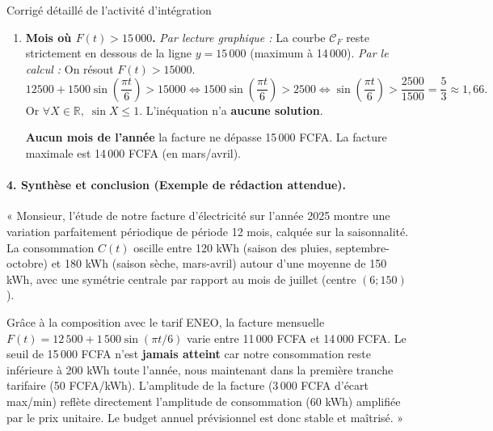\documentclass[11pt]{article}
\begin{document}
\begin{exoresolu}{Corrigé détaillé de l'activité d'intégration}
\begin{enumerate}
    \item \textbf{Mois où $F(t) > 15\,000$.}
    \emph{Par lecture graphique :} La courbe $\mathcal{C}_F$ reste strictement en dessous de la ligne $y=15\,000$ (maximum à 14\,000).
    \emph{Par le calcul :} On résout $F(t) > 15000$.
    \[
    12500 + 1500 \sin\left(\frac{\pi t}{6}\right) > 15000
    \iff 1500 \sin\left(\frac{\pi t}{6}\right) > 2500
    \iff \sin\left(\frac{\pi t}{6}\right) > \frac{2500}{1500} = \frac{5}{3} \approx 1,66.
    \]
    Or $\forall X \in \mathbb{R},\; \sin X \le 1$. L'inéquation n'a \textbf{aucune solution}.
    \begin{aretenir}[Conclusion Q3.2]
    \textbf{Aucun mois de l'année} la facture ne dépasse 15\,000 FCFA. La facture maximale est 14\,000 FCFA (en mars/avril).
    \end{aretenir}
\end{enumerate}

\paragraph{4. Synthèse et conclusion (Exemple de rédaction attendue).}
\begin{exemplebox}
« Monsieur, l'étude de notre facture d'électricité sur l'année 2025 montre une variation parfaitement périodique de période 12 mois, calquée sur la saisonnalité. La consommation $C(t)$ oscille entre 120 kWh (saison des pluies, septembre-octobre) et 180 kWh (saison sèche, mars-avril) autour d'une moyenne de 150 kWh, avec une symétrie centrale par rapport au mois de juillet (centre $(6;150)$). 

Grâce à la composition avec le tarif ENEO, la facture mensuelle $F(t) = 12\,500 + 1\,500 \sin(\pi t/6)$ varie entre 11\,000 FCFA et 14\,000 FCFA. Le seuil de 15\,000 FCFA n'est \textbf{jamais atteint} car notre consommation reste inférieure à 200 kWh toute l'année, nous maintenant dans la première tranche tarifaire (50 FCFA/kWh). L'amplitude de la facture (3\,000 FCFA d'écart max/min) reflète directement l'amplitude de consommation (60 kWh) amplifiée par le prix unitaire. Le budget annuel prévisionnel est donc stable et maîtrisé. »
\end{exemplebox}
\end{exoresolu}
\end{document}
